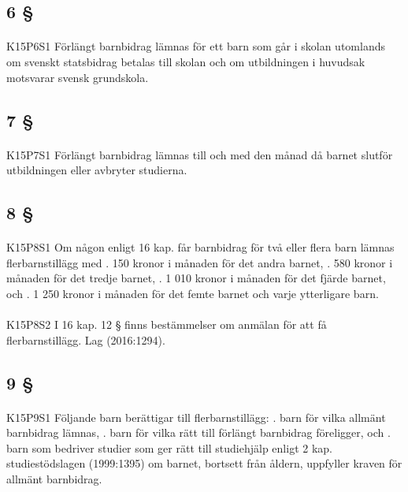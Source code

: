 \documentclass[a4paper,notitlepage,openany,10pt]{book}
\begin{document}
\subsection*{6 §}
\paragraph*{}
{\tiny K15P6S1}
Förlängt barnbidrag lämnas för ett barn som går i skolan utomlands om svenskt statsbidrag betalas till skolan och om utbildningen i huvudsak motsvarar svensk grundskola.
\subsection*{7 §}
\paragraph*{}
{\tiny K15P7S1}
Förlängt barnbidrag lämnas till och med den månad då barnet slutför utbildningen eller avbryter studierna.
\subsection*{8 §}
\paragraph*{}
{\tiny K15P8S1}
Om någon enligt 16 kap. får barnbidrag för två eller flera barn lämnas flerbarnstillägg med
. 150 kronor i månaden för det andra barnet,
. 580 kronor i månaden för det tredje barnet,
. 1 010 kronor i månaden för det fjärde barnet, och
. 1 250 kronor i månaden för det femte barnet och varje ytterligare barn.
\paragraph*{}
{\tiny K15P8S2}
I 16 kap. 12 § finns bestämmelser om anmälan för att få flerbarnstillägg.
Lag (2016:1294).
\subsection*{9 §}
\paragraph*{}
{\tiny K15P9S1}
Följande barn berättigar till flerbarnstillägg:
. barn för vilka allmänt barnbidrag lämnas,
. barn för vilka rätt till förlängt barnbidrag föreligger, och
. barn som bedriver studier som ger rätt till studiehjälp enligt 2 kap. studiestödslagen (1999:1395) om barnet, bortsett från åldern, uppfyller kraven för allmänt barnbidrag.
\end{document}

